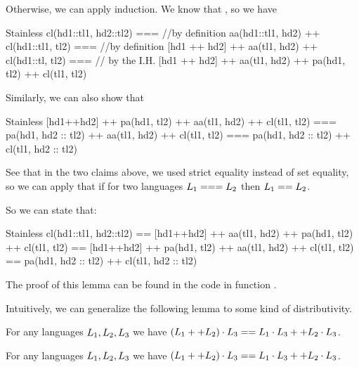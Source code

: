 Otherwise, we can apply induction. We know that , so we have

\begin{ShortCode}{Stainless}
 cl(hd1::tl1, hd2::tl2) === 
 //by definition
 aa(hd1::tl1, hd2) ++ cl(hd1::tl1, tl2) === 
 //by definition
 [hd1 ++ hd2] ++ aa(tl1, hd2) ++ cl(hd1::tl, tl2)  === 
 // by the I.H.
 [hd1 ++ hd2] ++ aa(tl1, hd2) ++ pa(hd1, tl2) ++ cl(tl1, tl2)
\end{ShortCode} 

Similarly, we can also show that 

\begin{ShortCode}{Stainless}
 [hd1++hd2] ++ pa(hd1, tl2) ++ aa(tl1, hd2) ++ cl(tl1, tl2) ===
 pa(hd1, hd2 :: tl2) ++ aa(tl1, hd2) ++ cl(tl1, tl2) ===
 pa(hd1, hd2 :: tl2) ++ cl(tl1, hd2 :: tl2)
\end{ShortCode} 

See that in the two claims above, we used strict equality instead of set equality, so we can apply that if for two languages $L_{1} === L_{2}$ then $L_{1} == L_{2}$.

So we can state that:

\begin{ShortCode}{Stainless}
 cl(hd1::tl1, hd2::tl2) ==
 [hd1++hd2] ++ aa(tl1, hd2) ++ pa(hd1, tl2) ++ cl(tl1, tl2) ==
 [hd1++hd2] ++ pa(hd1, tl2) ++  aa(tl1, hd2) ++ cl(tl1, tl2) ==
 pa(hd1, hd2 :: tl2) ++ cl(tl1, hd2 :: tl2)
\end{ShortCode}

The proof of this lemma can be found in the code in function .

Intuitively, we can generalize the following lemma to some kind of distributivity.

\begin{lemma}
	\label{lem:clLeftDistributiveAppend}
	For any languages $L_{1}, L_{2}, L_{3}$ we have $(L_{1} ++ L_{2}) \cdot L_{3} == L_{1} \cdot L_{3} ++ L_{2} \cdot L_{3}$.
\end{lemma}

\begin{lemma}
	\label{lem:clRightDistributiveAppend}
	For any languages $L_{1}, L_{2}, L_{3}$ we have $(L_{1} ++ L_{2}) \cdot L_{3} == L_{1} \cdot L_{3} ++ L_{2} \cdot L_{3}$.
\end{lemma}

